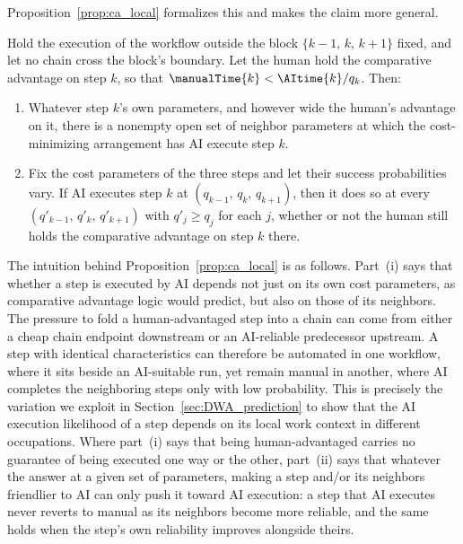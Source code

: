 Proposition~\ref{prop:ca_local} formalizes this and makes the claim more general.

\begin{proposition}
\label{prop:ca_local}
Hold the execution of the workflow outside the block $\{k-1,\, k,\, k+1\}$ fixed, and let no chain cross the block's boundary.
Let the human hold the comparative advantage on step $k$, so that $\manualTime{k} < \AItime{k}/q_k$.
Then:
\begin{enumerate}
\item[(i)] Whatever step $k$'s own parameters, and however wide the human's advantage on it, there is a nonempty open set of neighbor parameters at which the cost-minimizing arrangement has AI execute step $k$.
\item[(ii)] Fix the cost parameters of the three steps and let their success probabilities vary. If AI executes step $k$ at $(q_{k-1},\, q_k,\, q_{k+1})$, then it does so at every $(q'_{k-1},\, q'_k,\, q'_{k+1})$ with $q'_j \geq q_j$ for each $j$, whether or not the human still holds the comparative advantage on step $k$ there.
\end{enumerate}
\end{proposition}

The intuition behind Proposition~\ref{prop:ca_local} is as follows.
Part~(i) says that whether a step is executed by AI depends not just on its own cost parameters, as comparative advantage logic would predict, but also on those of its neighbors.
The pressure to fold a human-advantaged step into a chain can come from either a cheap chain endpoint downstream or an AI-reliable predecessor upstream.
A step with identical characteristics can therefore be automated in one workflow, where it sits beside an AI-suitable run, yet remain manual in another, where AI completes the neighboring steps only with low probability.
This is precisely the variation we exploit in Section~\ref{sec:DWA_prediction} to show that the AI execution likelihood of a step depends on its local work context in different occupations.
Where part~(i) says that being human-advantaged carries no guarantee of being executed one way or the other, part~(ii) says that whatever the answer at a given set of parameters, making a step and/or its neighbors friendlier to AI can only push it toward AI execution: a step that AI executes never reverts to manual as its neighbors become more reliable, and the same holds when the step's own reliability improves alongside theirs.

